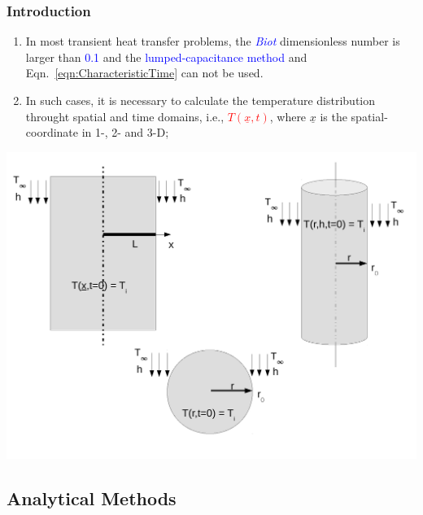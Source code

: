 \documentclass[10pt,compress,unknownkeysallowed]{beamer}
\newcommand{\red}{\textcolor{red}}
\newcommand{\blue}{\textcolor{blue}}
\begin{document}
\begin{frame}
 \frametitle{Introduction}
   \begin{enumerate}%
     \item<1-> In most transient heat transfer problems, the \blue{\it Biot} dimensionless number is larger than \blue{0.1} and the \blue{lumped-capacitance method} and Eqn.~\ref{eqn:CharacteristicTime} can not be used.
     \item<2-> In such cases, it is necessary to calculate the temperature distribution throught spatial and time domains, i.e., \red{$T\left(\underline{x},t\right)$}, where $\underline{x}$ is the spatial-coordinate in 1-, 2- and 3-D;
   \end{enumerate}

   \begin{center}
      \includegraphics[width=0.55\columnwidth,height=0.45\columnwidth,clip]{./Pics/HT_All}
   \end{center}
\end{frame}


\subsection{Analytical Methods}
\end{document}
